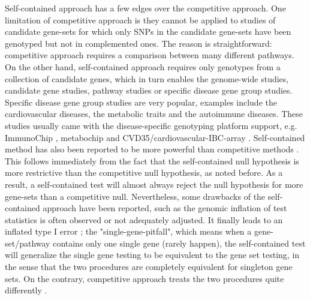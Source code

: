 \documentclass[12pt]{article}
\begin{document}
Self-contained approach has a few edges over the competitive approach. One limitation of competitive approach is they cannot be applied to studies of candidate gene-sets for
which only SNPs in the candidate gene-sets have been genotyped but not in complemented ones. The reason is straightforward: competitive approach requires a comparison between many different pathways. On the other hand, self-contained approach requires only genotypes from a collection of candidate genes, which in turn enables the genome-wide studies, candidate gene studies, pathway studies or specific disease gene group studies. Specific disease gene group studies are very popular, examples include the cardiovascular diseases, the metabolic traits and the autoimmune diseases. These studies usually came with the disease-specific genotyping platform support, e.g. ImmunoChip \cite{Cortes2011}, metabochip \cite{Voight2012} and CVD35/cardiovascular-IBC-array \cite{Cheng1999,Keating2008}. Self-contained method has also been reported to be more powerful than competitive methods \cite{Goeman2007}. This follows immediately from the fact that the self-contained null hypothesis is more restrictive than the competitive null hypothesis, as noted before. As a result, a self-contained test will almost always reject the null hypothesis for more gene-sets than a competitive null. Nevertheless, some drawbacks of the self-contained approach have been reported, such as the genomic inflation of test statistics is often observed or not adequately adjusted. It finally leads to an inflated type I error \cite{wang2007pathway,Goeman2007,Fridley2010}; the "single-gene-pitfall", which means when a gene-set/pathway contains only one single gene (rarely happen), the self-contained test will generalize the single gene testing to be equivalent to the gene set testing, in the sense that the two procedures are completely equivalent for singleton gene sets. On the contrary, competitive approach treats the two procedures quite differently \cite{Goeman2007}. 
\end{document}
